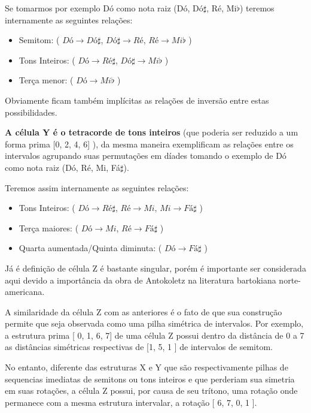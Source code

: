 \documentclass[
	12pt,				%
	openright,			%
	twoside,			%
	a4paper,			%
	english,			%
	french,				%
	spanish,			%
	brazil				%
	]{abntex2}
\begin{document}
Se tomarmos por exemplo Dó como nota raiz (Dó, Dó$\sharp$, Ré, Mi$\flat$) teremos internamente as seguintes relações:


\begin{itemize}
\item Semitom: ( $Dó \rightarrow Dó\sharp$, $Dó\sharp \rightarrow Ré$, $Ré \rightarrow Mi\flat$ ) 

\item Tons Inteiros: ( $Dó \rightarrow Ré\sharp$, $Dó\sharp \rightarrow Mi\flat$ )

\item Terça menor: ( $Dó \rightarrow Mi\flat$ )
\end{itemize}

Obviamente ficam também implícitas as relações de inversão entre estas possibilidades.

\textbf{A célula Y é o tetracorde de tons inteiros} (que poderia ser reduzido a um forma prima [0, 2, 4, 6] ), da mesma maneira  exemplificam as relações entre os intervalos agrupando suas permutações em díades tomando o exemplo de Dó como nota raiz (Dó, Ré, Mi, Fá$\sharp$). 

Teremos assim internamente as seguintes relações:

\begin{itemize}
\item Tons Inteiros: ( $Dó \rightarrow Ré\sharp$, $Ré \rightarrow Mi$, $Mi \rightarrow Fá\sharp$ ) 

\item Terça maiores: ( $Dó \rightarrow Mi$, $Ré \rightarrow Fá\sharp$ )

\item Quarta aumentada/Quinta diminuta: ( $Dó \rightarrow Fá\sharp$ )
\end{itemize}


Já é definição de célula Z é bastante singular, porém é importante ser considerada aqui devido a importância da obra de Antokoletz na literatura bartokiana norte-americana. 

A similaridade da célula Z com as anteriores é o fato de que sua construção permite que seja observada como uma pilha simétrica de intervalos. Por exemplo, a estrutura prima [ 0, 1, 6, 7] de uma célula Z possui dentro da distância de 0 a 7 as distâncias simétricas respectivas de [1, 5, 1 ] de intervalos de semitom. 

No entanto, diferente das estruturas X e Y que são respectivamente pilhas de sequencias imediatas de semitons ou tons inteiros e que perderiam sua simetria em suas rotações, a célula Z possui, por causa de seu trítono, uma rotação onde permanece com a mesma estrutura intervalar, a rotação [ 6, 7, 0, 1 ]. 
\end{document}
